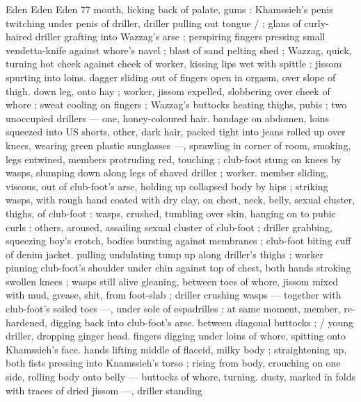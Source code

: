Eden Eden Eden 77
mouth, licking back of palate, gums : Khamssieh’s penis twitching
under penis of driller, driller pulling out tongue / ; glans of curly-
haired driller grafting into Wazzag's arse ; perspiring fingers
pressing small vendetta-knife against whore's navel ; blast of sand
pelting shed ; Wazzag, quick, turning hot cheek against cheek of
worker, kissing lips wet with spittle : jissom spurting into loins.
dagger sliding out of fingers open in orgasm, over slope of thigh.
down leg, onto hay ; worker, jissom expelled, slobbering over cheek
of whore ; sweat cooling on fingers ; Wazzag's buttocks heating
thighs, pubis ; two unoccupied drillers — one, honey-coloured hair.
bandage on abdomen, loins squeezed into US shorts, other, dark
hair, packed tight into jeans rolled up over knees, wearing green
plastic sunglasses —, sprawling in corner of room, smoking, legs
entwined, members protruding red, touching ; club-foot stung on
knees by wasps, slumping down along legs of shaved driller ; worker.
member sliding, viscous, out of club-foot's arse, holding up
collapsed body by hips ; striking wasps, with rough hand coated with
dry clay, on chest, neck, belly, sexual cluster, thighs, of club-foot :
wasps, crushed, tumbling over skin, hanging on to pubic curls :
others, aroused, assailing sexual cluster of club-foot ; driller
grabbing, squeezing boy's crotch, bodies bursting against
membranes ; club-foot biting cuff of denim jacket. pulling undulating
tump up along driller's thighs ; worker pinning club-foot's shoulder
under chin against top of chest, both hands stroking swollen knees
; wasps still alive gleaning, between toes of whore, jissom mixed with
mud, grease, shit, from foot-slab ; driller crushing wasps — together
with club-foot's soiled toes —, under sole of espadrilles ; at same
moment, member, re-hardened, digging back into club-foot's arse.
between diagonal buttocks ; / young driller, dropping ginger head.
fingers digging under loins of whore, spitting onto Khamssieh’s face.
hands lifting middle of flaccid, milky body ; straightening up, both
fists pressing into Knamssieh’s torso ; rising from body, crouching on
one side, rolling body onto belly — buttocks of whore, turning.
dusty, marked in folds with traces of dried jissom —, driller standing

